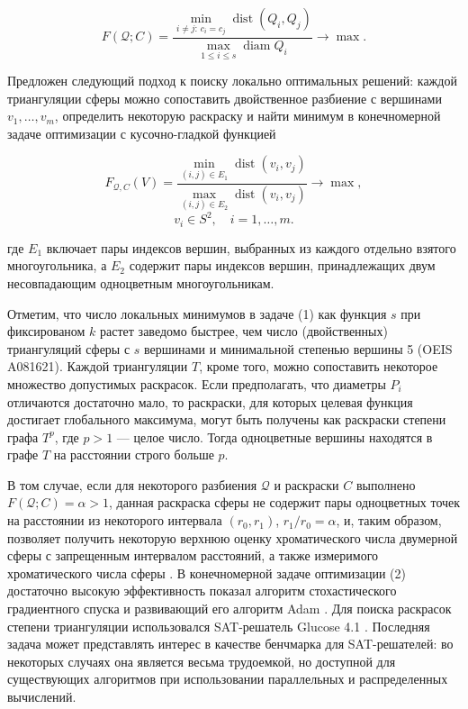 \begin{equation}
    F(\mathcal{Q}; C) = \frac{\min_{i \neq j:\, c_i = c_j} \operatorname{dist}(Q_i,Q_j)}{\max_{1 \leq i \leq s} \operatorname{diam} Q_i} \rightarrow \operatorname{max}.
\end{equation}

Предложен следующий подход к поиску локально оптимальных решений:  каждой триангуляции сферы   можно сопоставить двойственное разбиение с вершинами $v_1, \dots , v_m$, определить некоторую раскраску и найти минимум в конечномерной задаче оптимизации с кусочно-гладкой функцией

\begin{equation}
    F_{\mathcal{Q},C}(V) = \frac{\min_{(i, j) \in E_1} \operatorname{dist}(v_i,v_j)}{\max_{(i,j) \in E_2} \operatorname{dist}(v_i,v_j)} \rightarrow \operatorname{max},     
\end{equation}
\[
    v_i \in S^2, \quad i=1, \dots, m.
\]

\noindent где $E_1$ включает пары индексов вершин, выбранных из каждого отдельно взятого многоугольника, а $E_2$ содержит пары индексов вершин, принадлежащих двум несовпадающим одноцветным многоугольникам. 

Отметим, что число локальных минимумов в задаче (1) как функция $s$ при фиксированом $k$ растет заведомо быстрее, чем число (двойственных) триангуляций сферы с $s$ вершинами и минимальной степенью вершины 5 (OEIS A081621). Каждой триангуляции $T$, кроме того, можно сопоставить некоторое множество допустимых раскрасок. Если предполагать, что диаметры $P_i$ отличаются достаточно мало, то раскраски, для которых целевая функция достигает глобального максимума, могут быть получены как раскраски степени графа $T^p$, где  $p>1$ --- целое число.  Тогда  одноцветные вершины находятся в графе $T$ на расстоянии строго больше $p$. 

В том случае, если для некоторого разбиения $\mathcal{Q}$ и раскраски $C$ выполнено $F(\mathcal{Q}; C) = \alpha>1$, данная раскраска сферы не содержит пары одноцветных точек на расстоянии из некоторого интервала $(r_0, r_1)$, $r_1/r_0 = \alpha$, и, таким образом, позволяет получить некоторую верхнюю оценку хроматического числа двумерной сферы с запрещенным интервалом расстояний, а также измеримого хроматического числа сферы \cite{Simmons,Malen,Sirgedas}. В конечномерной задаче оптимизации (2) достаточно высокую эффективность показал алгоритм стохастического градиентного спуска и развивающий его алгоритм Adam \cite{Adam}. Для поиска раскрасок степени триангуляции использовался SAT-решатель Glucose 4.1 \cite{Glucose}. Последняя задача может представлять интерес в качестве бенчмарка для SAT-решателей: во некоторых случаях она является весьма трудоемкой, но доступной для существующих алгоритмов при использовании параллельных и распределенных вычислений. 



